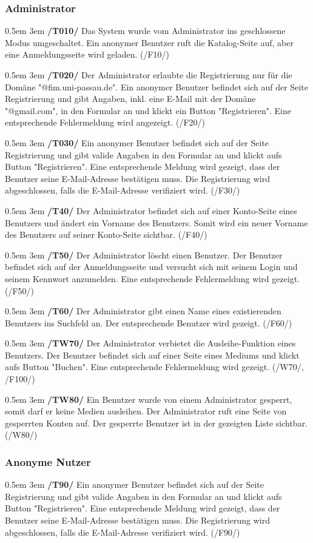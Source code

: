 \documentclass{article}
\newcommand{\specification}[3]{
	{\parindent 0.5em \hangindent 3em \hypertarget{spec:#1:#2}{\textbf{/#1#2/}} #3 \par \nobreak \vspace*{0.5em}}
}
\begin{document}
		\subsubsection{Administrator}
			\specification{T}{010}{Das System wurde vom Administrator ins geschlossene Modus umgeschaltet. Ein anonymer Benutzer ruft die Katalog-Seite auf, aber eine Anmeldungsseite wird geladen.­­­­­ (/F10/)}
			\specification{T}{020}{Der Administrator erlaubte die Registrierung nur für die Domäne "@fim.uni-passau.de". Ein anonymer Benutzer befindet sich auf der Seite Registrierung und gibt Angaben, inkl. eine E-Mail mit der Domäne "@gmail.com", in den Formular an und klickt ein Button "Registrieren". Eine entsprechende Fehlermeldung wird angezeigt. (/F20/)}
			\specification{T}{030}{Ein anonymer Benutzer befindet sich auf der Seite Registrierung und gibt valide Angaben in den Formular an und klickt aufs Button "Registrieren". Eine entsprechende Meldung wird gezeigt, dass der Benutzer seine E-Mail-Adresse bestätigen muss. Die Registrierung wird abgeschlossen, falls die E-Mail-Adresse verifiziert wird. (/F30/)}
			\specification{T}{40}{Der Administrator befindet sich auf einer Konto-Seite eines Benutzers und ändert ein Vorname des Benutzers. Somit wird ein neuer Vorname des Benutzers auf seiner Konto-Seite sichtbar. (/F40/)}
			\specification{T}{50}{Der Administrator löscht einen Benutzer. Der Benutzer befindet sich auf der Anmeldungsseite und versucht sich mit seinem Login und seinem Kennwort anzumelden. Eine entsprechende Fehlermeldung wird gezeigt. (/F50/)} 
			\specification{T}{60}{Der Administrator gibt einen Name eines existierenden Benutzers ins Suchfeld an. Der entsprechende Benutzer wird gezeigt. (/F60/)}
			\specification{TW}{70}{Der Administrator verbietet die Ausleihe-Funktion eines Benutzers. Der Benutzer befindet sich auf einer Seite eines Mediums und klickt aufs Button "Buchen". Eine entsprechende Fehlermeldung wird gezeigt. (/W70/, /F100/)}
			\specification{TW}{80}{Ein Benutzer wurde von einem Administrator gesperrt, somit darf er keine Medien ausleihen. Der Administrator ruft eine Seite von gesperrten Konten auf. Der gesperrte Benutzer ist in der gezeigten Liste sichtbar. (/W80/)}
			\subsubsection{Anonyme Nutzer}
			\specification{T}{90}{Ein anonymer Benutzer befindet sich auf der Seite Registrierung und gibt valide Angaben in den Formular an und klickt aufs Button "Registrieren". Eine entsprechende Meldung wird gezeigt, dass der Benutzer seine E-Mail-Adresse bestätigen muss. Die Registrierung wird abgeschlossen, falls die E-Mail-Adresse verifiziert wird. (/F90/)}
\end{document}
